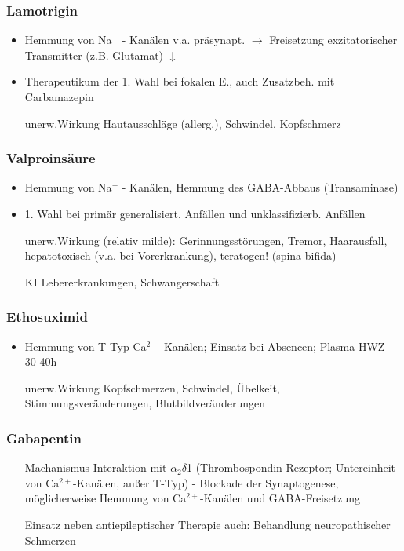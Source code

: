 \documentclass[10pt,a4paper]{report}
\begin{document}
\subsubsection{Lamotrigin} %
\label{ssub:lamotrigin}
\begin{itemize}
	\item Hemmung von Na$^+$ - Kanälen v.a. präsynapt. 
	$\rightarrow$ Freisetzung exzitatorischer Transmitter (z.B. Glutamat) $\downarrow$
	\item Therapeutikum der 1. Wahl bei fokalen E., auch Zusatzbeh. mit Carbamazepin
	\item[unerw.Wirkung] Hautausschläge (allerg.), Schwindel, Kopfschmerz
\end{itemize}
\subsubsection{Valproinsäure} %
\label{ssub:valproins_ure}
\begin{itemize}
	\item Hemmung von Na$^+$ - Kanälen, Hemmung des GABA-Abbaus (Transaminase) 
	\item 1. Wahl bei primär generalisiert. Anfällen und unklassifizierb. Anfällen
	\item[unerw.Wirkung] (relativ milde): Gerinnungsstörungen, Tremor, Haarausfall, hepatotoxisch (v.a. bei Vorerkrankung), teratogen! (spina bifida)
	\item[KI] Lebererkrankungen, Schwangerschaft
\end{itemize}
\subsubsection{Ethosuximid} %
\label{ssub:ethosuximid}
\begin{itemize}
	\item Hemmung von T-Typ Ca$^{2+}$-Kanälen; Einsatz bei Absencen; Plasma HWZ 30-40h
	\item[unerw.Wirkung] Kopfschmerzen, Schwindel, Übelkeit, Stimmungsveränderungen, Blutbildveränderungen
\end{itemize}
\subsubsection{Gabapentin} %
\label{ssub:gabapentin}

\begin{itemize}
	\item[Machanismus] Interaktion mit $\alpha_2$$\delta$1 (Thrombospondin-Rezeptor; Untereinheit von Ca$^{2+}$-Kanälen, außer T-Typ) - Blockade der Synaptogenese, möglicherweise Hemmung von Ca$^{2+}$-Kanälen und GABA-Freisetzung
	\item[Einsatz] neben antiepileptischer Therapie auch: Behandlung neuropathischer Schmerzen
\end{itemize}
\end{document}

